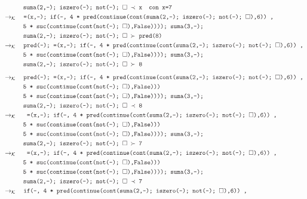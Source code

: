 \documentclass{article}
\newcommand{\tx}[1]{\textcolor{Black} {\texttt{#1}}}
\newcommand{\es}{$\square$}
\newcommand{\kr}{\rightarrow_{\mathcal{K}} \quad}
\begin{document}
\begin{enumerate}
\begin{enumerate}
\begin{align*}
			&\tx{\quad \quad \quad suma(2,-); iszero(-); not(-); \es $\ \prec $ x} \tx{\quad con x=7}\\	
			&\kr \tx{=(x,-); if(-, 4 * pred(continue(cont(suma(2,-); iszero(-); not(-); \es),6)) ,}\\
			&\tx {\quad \quad \quad 5 * suc(continue(cont(not(-); \es),False)))); suma(3,-);}\\
			&\tx{\quad \quad \quad suma(2,-); iszero(-); not(-); \es $\ \succ $ pred(8)} \\
			&\kr \tx{pred(-); =(x,-); if(-, 4 * pred(continue(cont(suma(2,-); iszero(-); not(-); \es),6)) ,}\\
			&\tx {\quad \quad \quad 5 * suc(continue(cont(not(-); \es),False)))); suma(3,-);}\\
			&\tx{\quad \quad \quad suma(2,-); iszero(-); not(-); \es $\ \succ $ 8} \\
			\end{align*}
			\begin{align*}
			&\kr \tx{pred(-); =(x,-); if(-, 4 * pred(continue(cont(suma(2,-); iszero(-); not(-); \es),6)) ,}\\
			&\tx{\quad \quad \quad 5 * suc(continue(cont(not(-); \es),False)))}\\
			&\tx {\quad \quad \quad 5 * suc(continue(cont(not(-); \es),False)))); suma(3,-);}\\
			&\tx{\quad \quad \quad suma(2,-); iszero(-); not(-); \es $\ \prec $ 8} \\
			&\kr \tx{ =(x,-); if(-, 4 * pred(continue(cont(suma(2,-); iszero(-); not(-); \es),6)) ,}\\
			&\tx{\quad \quad \quad 5 * suc(continue(cont(not(-); \es),False)))}\\
			&\tx {\quad \quad \quad 5 * suc(continue(cont(not(-); \es),False)))); suma(3,-);}\\
			&\tx{\quad \quad \quad suma(2,-); iszero(-); not(-); \es $\ \succ $ 7} \\
			&\kr \tx{ =(x,-); if(-, 4 * pred(continue(cont(suma(2,-); iszero(-); not(-); \es),6)) ,}\\
			&\tx{\quad \quad \quad 5 * suc(continue(cont(not(-); \es),False)))}\\
			&\tx {\quad \quad \quad 5 * suc(continue(cont(not(-); \es),False)))); suma(3,-);}\\
			&\tx{\quad \quad \quad suma(2,-); iszero(-); not(-); \es $\ \prec $ 7} \\
			&\kr \tx{if(-, 4 * pred(continue(cont(suma(2,-); iszero(-); not(-); \es),6)) ,}\\

\end{align*}
\end{enumerate}
\end{enumerate}
\end{document}
